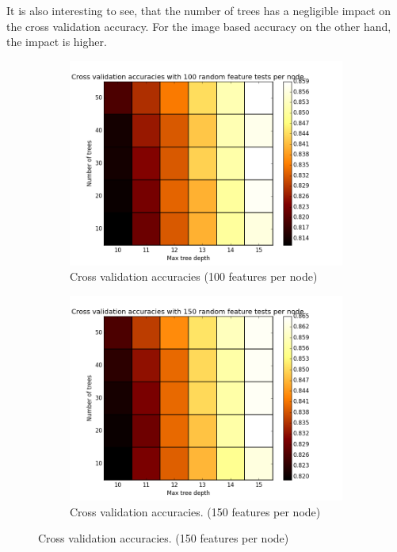 It is also interesting to see, that the number of trees has a negligible impact on the cross validation accuracy.
For the image based accuracy on the other hand, the impact is higher.


\begin{figure}
	\centering
	\begin{subfigure}{0.4\textwidth}
		\centering
		\includegraphics[width=\textwidth]{plots/heatmap_xacc_100.png}
		\caption{\scriptsize Cross validation accuracies (100 features per node)}
		\label{subfig:result_heatmap_xacc_100}
	\end{subfigure}
  \hspace{0.05\textwidth}
	\begin{subfigure}{0.4\textwidth}
		\centering
		\includegraphics[width=\textwidth]{plots/heatmap_xacc_150.png}
		\caption{\scriptsize Cross validation accuracies. (150 features per node)}
		\label{subfig:result_heatmap_xacc_150}
	\end{subfigure}
  

\end{figure}
